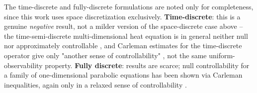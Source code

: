 The time-discrete and fully-discrete formulations are noted only for
completeness, since this work uses space discretization exclusively.
\textbf{Time-discrete}: this is a genuine \emph{negative} result, not a milder
version of the space-discrete case above -- the time-semi-discrete
multi-dimensional heat equation is in general neither null nor approximately
controllable \citep{zheng2008controllability}, and Carleman estimates for the
time-discrete operator give only "another sense of controllability"
\citep{boyer2020carleman}, not the same uniform-observability property.
\textbf{Fully discrete}: results are scarce; null controllability for a
family of one-dimensional parabolic equations has been shown via Carleman
inequalities, again only in a relaxed sense of controllability
\citep{casanova2021carleman}.
